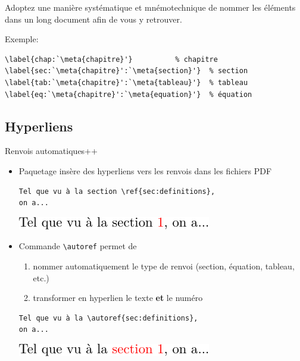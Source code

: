 \begin{conseil}
  Adoptez une manière systématique et mnémotechnique de nommer les
  éléments dans un long document afin de vous y retrouver.

  \bigskip %
  Exemple:
\begin{lstlisting}
\label{chap:`\meta{chapitre}'}          % chapitre
\label{sec:`\meta{chapitre}':`\meta{section}'}  % section
\label{tab:`\meta{chapitre}':`\meta{tableau}'}  % tableau
\label{eq:`\meta{chapitre}':`\meta{equation}'}  % équation
\end{lstlisting}
\end{conseil}


\subsection{Hyperliens}

Renvois automatiques++

\begin{itemize}
\item Paquetage  insère des hyperliens vers les renvois
  dans les fichiers PDF
  \begin{demo}
\begin{lstlisting}
Tel que vu à la section \ref{sec:definitions},
on a...
\end{lstlisting}
    \begin{framed}
      \includegraphics{renvoi_avec_ref}
    \end{framed}
  \end{demo}
\item Commande \verb=\autoref= permet de
  \begin{enumerate}
  \item nommer automatiquement le type de renvoi (section, équation,
    tableau, etc.)
  \item transformer en hyperlien le texte \textbf{et} le numéro
  \end{enumerate}
  \begin{demo}
\begin{lstlisting}
Tel que vu à la \autoref{sec:definitions},
on a...
\end{lstlisting}
    \begin{framed}
      \includegraphics{renvoi_avec_autoref}
    \end{framed}
  \end{demo}
\end{itemize}



